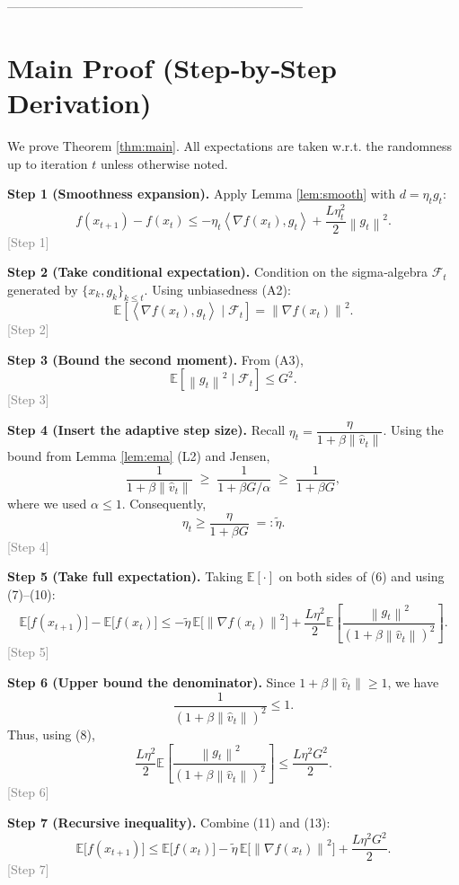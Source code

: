 \documentclass{article}
\newcommand{\E}{\mathbb{E}}
\newcommand{\norm}[1]{\left\|#1\right\|}
\newcommand{\ip}[2]{\left\langle #1,#2\right\rangle}
\newcommand{\grad}{\nabla}
\begin{document}
-----------------------------------------------------------------------

\section*{Main Proof (Step‑by‑Step Derivation)}
We prove Theorem \ref{thm:main}. All expectations are taken w.r.t. the randomness up to iteration $t$ unless otherwise noted.

\noindent\textbf{Step 1 (Smoothness expansion).}  
Apply Lemma \ref{lem:smooth} with $d=\eta_{t}g_{t}$:
\[
f(x_{t+1})-f(x_{t})\le -\eta_{t}\ip{\grad f(x_{t})}{g_{t}}+\frac{L\eta_{t}^{2}}{2}\norm{g_{t}}^{2}.
\tag{6}
\]
\textcolor{gray}{[Step 1]}

\noindent\textbf{Step 2 (Take conditional expectation).}  
Condition on the sigma‑algebra $\mathcal{F}_{t}$ generated by $\{x_{k},g_{k}\}_{k\le t}$. Using unbiasedness (A2):
\[
\E\!\left[\ip{\grad f(x_{t})}{g_{t}}\mid\mathcal{F}_{t}\right]
= \norm{\grad f(x_{t})}^{2}.
\tag{7}
\]
\textcolor{gray}{[Step 2]}

\noindent\textbf{Step 3 (Bound the second moment).}  
From (A3),
\[
\E\!\left[\norm{g_{t}}^{2}\mid\mathcal{F}_{t}\right]\le G^{2}.
\tag{8}
\]
\textcolor{gray}{[Step 3]}

\noindent\textbf{Step 4 (Insert the adaptive step size).}  
Recall $\eta_{t}= \dfrac{\eta}{1+\beta\norm{\hat v_{t}}}$. Using the bound from Lemma \ref{lem:ema} (L2) and Jensen,
\[
\frac{1}{1+\beta\norm{\hat v_{t}}}\;\ge\;
\frac{1}{1+\beta G/\alpha}
\;\ge\; \frac{1}{1+\beta G},
\tag{9}
\]
where we used $\alpha\le1$. Consequently,
\[
\eta_{t}\ge \frac{\eta}{1+\beta G}\;=: \tilde\eta .
\tag{10}
\]
\textcolor{gray}{[Step 4]}

\noindent\textbf{Step 5 (Take full expectation).}  
Taking $\E[\cdot]$ on both sides of (6) and using (7)–(10):
\[
\E\!\bigl[f(x_{t+1})\bigr]-\E\!\bigl[f(x_{t})\bigr]
\le -\tilde\eta\,\E\!\bigl[\norm{\grad f(x_{t})}^{2}\bigr]
+\frac{L\eta^{2}}{2}\E\!\left[\frac{\norm{g_{t}}^{2}}{(1+\beta\norm{\hat v_{t}})^{2}}\right].
\tag{11}
\]
\textcolor{gray}{[Step 5]}

\noindent\textbf{Step 6 (Upper bound the denominator).}  
Since $1+\beta\norm{\hat v_{t}}\ge1$, we have
\[
\frac{1}{(1+\beta\norm{\hat v_{t}})^{2}}\le 1.
\tag{12}
\]
Thus, using (8),
\[
\frac{L\eta^{2}}{2}\E\!\left[\frac{\norm{g_{t}}^{2}}{(1+\beta\norm{\hat v_{t}})^{2}}\right]
\le \frac{L\eta^{2}G^{2}}{2}.
\tag{13}
\]
\textcolor{gray}{[Step 6]}

\noindent\textbf{Step 7 (Recursive inequality).}  
Combine (11) and (13):
\[
\E\!\bigl[f(x_{t+1})\bigr]\le \E\!\bigl[f(x_{t})\bigr]
-\tilde\eta\,\E\!\bigl[\norm{\grad f(x_{t})}^{2}\bigr]
+\frac{L\eta^{2}G^{2}}{2}.
\tag{14}
\]
\textcolor{gray}{[Step 7]}
\end{document}
